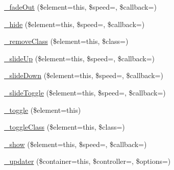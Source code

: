 \begin{DoxyCompactItemize}
\mbox{\hyperlink{class_c_i___jquery_a450b3e1f437001e56dcb15ad73ef4b93}{\+\_\+fade\+Out}} (\$element=\textquotesingle{}this\textquotesingle{}, \$speed=\textquotesingle{}\textquotesingle{}, \$callback=\textquotesingle{}\textquotesingle{})
\item 
\mbox{\hyperlink{class_c_i___jquery_a11a78a5297f13443708684ef7858a49c}{\+\_\+hide}} (\$element=\textquotesingle{}this\textquotesingle{}, \$speed=\textquotesingle{}\textquotesingle{}, \$callback=\textquotesingle{}\textquotesingle{})
\item 
\mbox{\hyperlink{class_c_i___jquery_af268174048a2d84ad3df004cec7b0a04}{\+\_\+remove\+Class}} (\$element=\textquotesingle{}this\textquotesingle{}, \$class=\textquotesingle{}\textquotesingle{})
\item 
\mbox{\hyperlink{class_c_i___jquery_a60ec32e453a0d1788fd444e35eca4de4}{\+\_\+slide\+Up}} (\$element=\textquotesingle{}this\textquotesingle{}, \$speed=\textquotesingle{}\textquotesingle{}, \$callback=\textquotesingle{}\textquotesingle{})
\item 
\mbox{\hyperlink{class_c_i___jquery_ac21f8bc7079c6a6e7faf04706a268728}{\+\_\+slide\+Down}} (\$element=\textquotesingle{}this\textquotesingle{}, \$speed=\textquotesingle{}\textquotesingle{}, \$callback=\textquotesingle{}\textquotesingle{})
\item 
\mbox{\hyperlink{class_c_i___jquery_aa00f8e284d752d889cb03e24d6313688}{\+\_\+slide\+Toggle}} (\$element=\textquotesingle{}this\textquotesingle{}, \$speed=\textquotesingle{}\textquotesingle{}, \$callback=\textquotesingle{}\textquotesingle{})
\item 
\mbox{\hyperlink{class_c_i___jquery_aa1c932f4aba1d5c8259da4dfd7e7a106}{\+\_\+toggle}} (\$element=\textquotesingle{}this\textquotesingle{})
\item 
\mbox{\hyperlink{class_c_i___jquery_afcfe440e86ec038bc62ac9be2296313b}{\+\_\+toggle\+Class}} (\$element=\textquotesingle{}this\textquotesingle{}, \$class=\textquotesingle{}\textquotesingle{})
\item 
\mbox{\hyperlink{class_c_i___jquery_afc1e291a9264809af8cbb0bb4a30dcb2}{\+\_\+show}} (\$element=\textquotesingle{}this\textquotesingle{}, \$speed=\textquotesingle{}\textquotesingle{}, \$callback=\textquotesingle{}\textquotesingle{})
\item 
\mbox{\hyperlink{class_c_i___jquery_ad9649192c4d81a3712aa0defc13c7ed3}{\+\_\+updater}} (\$container=\textquotesingle{}this\textquotesingle{}, \$controller=\textquotesingle{}\textquotesingle{}, \$options=\textquotesingle{}\textquotesingle{})

\end{DoxyCompactItemize}
